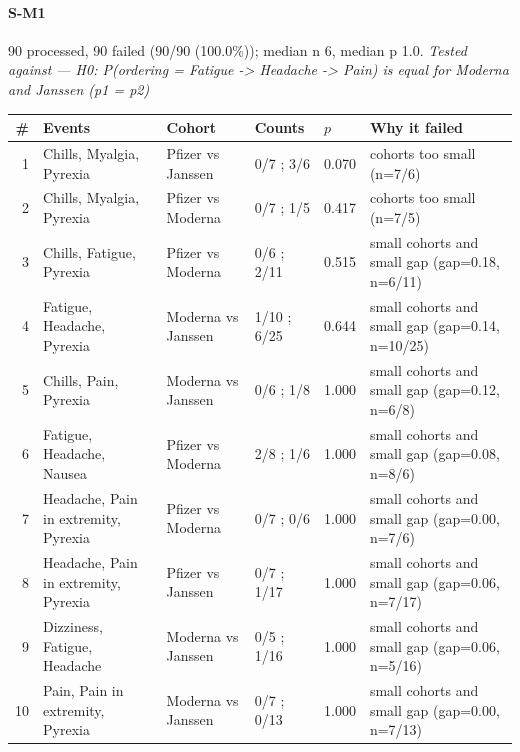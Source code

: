 \documentclass[11pt]{article}
\begin{document}
\paragraph{S-M1} 90 processed, 90 failed (90/90 (100.0\%)); median n 6, median p 1.0. \emph{Tested against --- H0: P(ordering = Fatigue -> Headache -> Pain) is equal for Moderna and Janssen (p1 = p2)} \\
\begin{longtable}{@{}r p{3.9cm} p{2.5cm} l l p{4.4cm}@{}}
\toprule
\# & Events & Cohort & Counts & $p$ & Why it failed \\
\midrule \endhead
1 & Chills, Myalgia, Pyrexia & Pfizer vs Janssen & 0/7 ; 3/6 & 0.070 & cohorts too small (n=7/6) \\
2 & Chills, Myalgia, Pyrexia & Pfizer vs Moderna & 0/7 ; 1/5 & 0.417 & cohorts too small (n=7/5) \\
3 & Chills, Fatigue, Pyrexia & Pfizer vs Moderna & 0/6 ; 2/11 & 0.515 & small cohorts and small gap (gap=0.18, n=6/11) \\
4 & Fatigue, Headache, Pyrexia & Moderna vs Janssen & 1/10 ; 6/25 & 0.644 & small cohorts and small gap (gap=0.14, n=10/25) \\
5 & Chills, Pain, Pyrexia & Moderna vs Janssen & 0/6 ; 1/8 & 1.000 & small cohorts and small gap (gap=0.12, n=6/8) \\
6 & Fatigue, Headache, Nausea & Pfizer vs Moderna & 2/8 ; 1/6 & 1.000 & small cohorts and small gap (gap=0.08, n=8/6) \\
7 & Headache, Pain in extremity, Pyrexia & Pfizer vs Moderna & 0/7 ; 0/6 & 1.000 & small cohorts and small gap (gap=0.00, n=7/6) \\
8 & Headache, Pain in extremity, Pyrexia & Pfizer vs Janssen & 0/7 ; 1/17 & 1.000 & small cohorts and small gap (gap=0.06, n=7/17) \\
9 & Dizziness, Fatigue, Headache & Moderna vs Janssen & 0/5 ; 1/16 & 1.000 & small cohorts and small gap (gap=0.06, n=5/16) \\
10 & Pain, Pain in extremity, Pyrexia & Moderna vs Janssen & 0/7 ; 0/13 & 1.000 & small cohorts and small gap (gap=0.00, n=7/13) \\
\bottomrule
\end{longtable}
\end{document}
